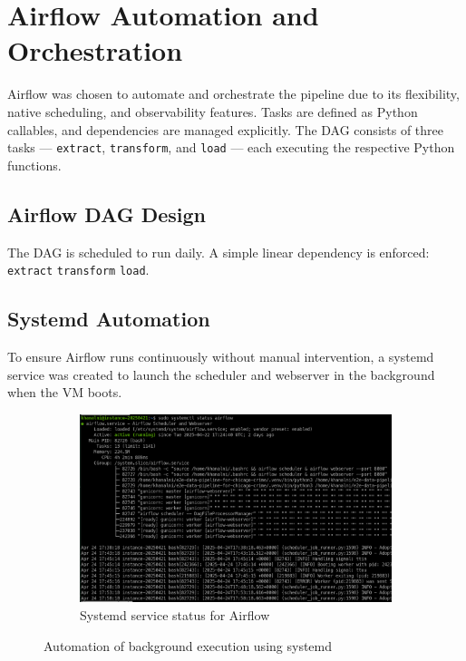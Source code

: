 \documentclass[12pt]{article}
\begin{document}
\section{Airflow Automation and Orchestration}

Airflow was chosen to automate and orchestrate the pipeline due to its flexibility, native scheduling, and observability features. Tasks are defined as Python callables, and dependencies are managed explicitly. The DAG consists of three tasks — \texttt{extract}, \texttt{transform}, and \texttt{load} — each executing the respective Python functions.

\subsection*{Airflow DAG Design}
The DAG is scheduled to run daily. A simple linear dependency is enforced: \texttt{extract} \textrightarrow{} \texttt{transform} \textrightarrow{} \texttt{load}.


\subsection*{Systemd Automation}
To ensure Airflow runs continuously without manual intervention, a systemd service was created to launch the scheduler and webserver in the background when the VM boots.

\begin{figure}[h!]
\centering
\begin{subfigure}{0.8\textwidth}
\includegraphics[width=\textwidth]{figures/systemd_status_airflow.png}
\caption{Systemd service status for Airflow}
\end{subfigure}
\hfill
\caption{Automation of background execution using systemd}
\label{fig:systemd}
\end{figure}
\end{document}
